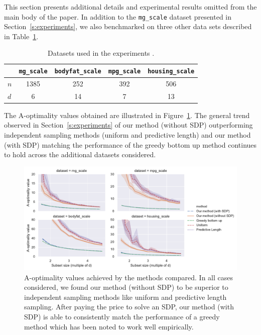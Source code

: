 This section presents additional details and experimental results omitted from
the main body of the paper. In addition to the \texttt{mg\_scale} dataset presented in
Section~\ref{s:experiments}, we also benchmarked on three other data sets
described in Table~\ref{tab:libsvm-datasets}.
\begin{table}[ht]
    \centering
    \caption{Datasets used in the experiments \citep{libsvm}.}
    \label{tab:libsvm-datasets}
    \begin{tabular}[t]{lcccc}
        \toprule
        & \texttt{mg\_scale} & \texttt{bodyfat\_scale} & \texttt{mpg\_scale} & \texttt{housing\_scale} \\
        \midrule
        $n$ & 1385 & 252 & 392 & 506 \\
        $d$ & 6 & 14 & 7 & 13\\
        \bottomrule
    \end{tabular}
\end{table}

The A-optimality values obtained are illustrated in Figure~\ref{f:obj-grid}.
The general trend observed in Section~\ref{s:experiments} of our method
(without SDP) outperforming independent sampling methods (uniform and
predictive length) and our method (with SDP) matching the performance of the
greedy bottom up method continues to hold across the additional datasets considered.

\begin{figure}[htpb]
    \centering
    \includegraphics[width=\textwidth]{../bayesian_figures/obj_grid.pdf}
    \caption{A-optimality values achieved by the methods compared. In all cases
        considered, we found our method (without SDP) to be superior to independent
        sampling methods like uniform and predictive length sampling. After paying the price
        to solve an SDP, our method (with SDP) is able to consistently match the performance
        of a greedy method which has been noted
        \citep{chamon2017approximate} to work well empirically.}
    \label{f:obj-grid}
\end{figure}


